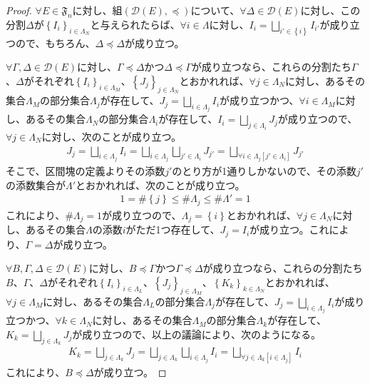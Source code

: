 \documentclass[dvipdfmx]{jsarticle}
\begin{document}
\begin{proof}
$\forall E \in \mathfrak{F}_{n}$に対し、組$\left( \mathcal{D}(E), \preccurlyeq \right)$について、$\forall\varDelta \in \mathcal{D}(E)$に対し、この分割$\varDelta$が$\left\{ I_{i} \right\}_{i \in \varLambda_{N}}$と与えられたらば、$\forall i \in \varLambda$に対し、$I_{i} = \bigsqcup_{i' \in \left\{ i \right\}} I_{i'}$が成り立つので、もちろん、$\varDelta \preccurlyeq \varDelta$が成り立つ。\par
$\forall\varGamma,\varDelta \in \mathcal{D}(E)$に対し、$\varGamma \preccurlyeq \varDelta$かつ$\varDelta \preccurlyeq \varGamma$が成り立つなら、これらの分割たち$\varGamma$、$\varDelta$がそれぞれ$\left\{ I_{i} \right\}_{i \in \varLambda_{M}}$、$\left\{ J_{j} \right\}_{j \in \varLambda_{N}}$とおかれれば、$\forall j \in \varLambda_{N}$に対し、あるその集合$\varLambda_{M}$の部分集合$\varLambda_{j}$が存在して、$J_{j} = \bigsqcup_{i \in \varLambda_{j}} I_{i}$が成り立つかつ、$\forall i \in \varLambda_{M}$に対し、あるその集合$\varLambda_{N}$の部分集合$\varLambda_{i}$が存在して、$I_{i} = \bigsqcup_{j \in \varLambda_{i}} J_{j}$が成り立つので、$\forall j \in \varLambda_{N}$に対し、次のことが成り立つ。
\begin{align*}
J_{j} = \bigsqcup_{i \in \varLambda_{j}} I_{i} = \bigsqcup_{i \in \varLambda_{j}} {\bigsqcup_{j' \in \varLambda_{i}} J_{j'}} = \bigsqcup_{\forall i \in \varLambda_{j}\left[ j' \in \varLambda_{i} \right]} J_{j'}
\end{align*}
そこで、区間塊の定義よりその添数$j'$のとり方が1通りしかないので、その添数$j'$の添数集合が$\varLambda'$とおかれれば、次のことが成り立つ。
\begin{align*}
1 = \#\left\{ j \right\} \leq \#\varLambda_{j} \leq \#\varLambda' = 1
\end{align*}
これにより、$\#\varLambda_{j} = 1$が成り立つので、$\varLambda_{j} = \left\{ i \right\}$とおかれれば、$\forall j \in \varLambda_{N}$に対し、あるその集合$\varLambda$の添数$i$がただ1つ存在して、$J_{j} = I_{i}$が成り立つ。これにより、$\varGamma = \varDelta$が成り立つ。\par
$\forall B,\varGamma,\varDelta \in \mathcal{D}(E)$に対し、$B \preccurlyeq \varGamma$かつ$\varGamma \preccurlyeq \varDelta$が成り立つなら、これらの分割たち$B$、$\varGamma$、$\varDelta$がそれぞれ$\left\{ I_{i} \right\}_{i \in \varLambda_{L} }$、$\left\{ J_{j} \right\}_{j \in \varLambda_{M} }$、$\left\{ K_{k} \right\}_{k \in \varLambda_{N} }$とおかれれば、$\forall j \in \varLambda_{M}$に対し、あるその集合$\varLambda_{L}$の部分集合$\varLambda_{j}$が存在して、$J_{j} = \bigsqcup_{i \in \varLambda_{j}} I_{i}$が成り立つかつ、$\forall k \in \varLambda_{N}$に対し、あるその集合$\varLambda_{M}$の部分集合$\varLambda_{k}$が存在して、$K_{k} = \bigsqcup_{j \in \varLambda_{k}} J_{j}$が成り立つので、以上の議論により、次のようになる。
\begin{align*}
K_{k} = \bigsqcup_{j \in \varLambda_{k}} J_{j} = \bigsqcup_{j \in \varLambda_{k}} {\bigsqcup_{i \in \varLambda_{j}} I_{i}} = \bigsqcup_{\forall j \in \varLambda_{k}\left[ i \in \varLambda_{j} \right]} I_{i}
\end{align*}
これにより、$B \preccurlyeq \varDelta$が成り立つ。
\end{proof}
\end{document}
